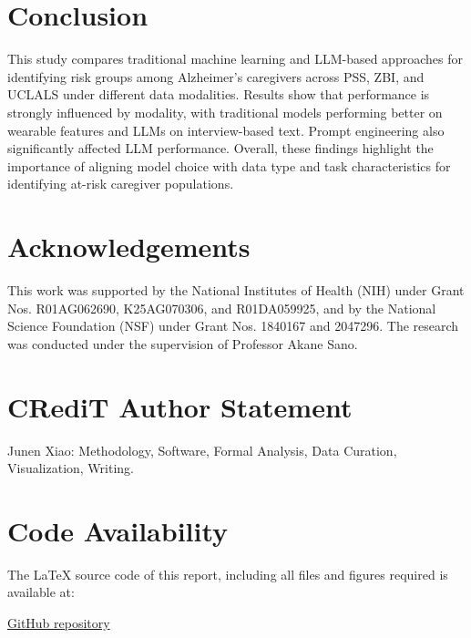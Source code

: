 \documentclass[letterpaper, 10 pt, conference]{ieeeconf}  %
\begin{document}
\section{Conclusion}
This study compares traditional machine learning and LLM-based approaches for identifying risk groups among Alzheimer’s caregivers across PSS, ZBI, and UCLALS under different data modalities. Results show that performance is strongly influenced by modality, with traditional models performing better on wearable features and LLMs on interview-based text. Prompt engineering also significantly affected LLM performance. Overall, these findings highlight the importance of aligning model choice with data type and task characteristics for identifying at-risk caregiver populations.


\section*{Acknowledgements}
This work was supported by the National Institutes of Health (NIH) under Grant Nos. R01AG062690, K25AG070306, and R01DA059925, and by the National Science Foundation (NSF) under Grant Nos. 1840167 and 2047296. The research was conducted under the supervision of Professor Akane Sano.

\section*{CRediT Author Statement}
Junen Xiao: Methodology, Software, Formal Analysis, Data Curation, Visualization, Writing.

\section*{Code Availability}
The LaTeX source code of this report, including all files and figures required is available at:

\href{https://github.com/PepperJess99/ELEC-594/tree/main/Final%20Report}{GitHub repository}

\newpage



\end{document}
